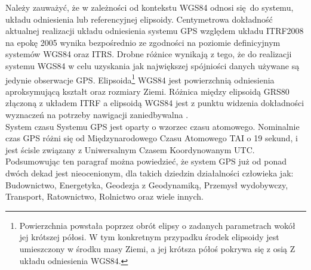 Należy zauważyć, że w zależności od kontekstu WGS84 odnosi się do systemu, układu odniesienia lub referencyjnej elipsoidy.
Centymetrowa dokładność aktualnej realizacji układu odniesienia systemu GPS względem układu ITRF2008 na epokę 2005
wynika bezpośrednio ze zgodności na poziomie definicyjnym systemów WGS84 oraz ITRS. Drobne różnice wynikają z tego, że do realizacji systemu WGS84 w celu uzyskania jak 
największej spójniości danych używane są jedynie obserwacje GPS. Elipsoida\footnote{Powierzchnia powstała poprzez obrót elipsy o zadanych parametrach wokół jej 
krótszej półosi. W tym konkretnym przypadku środek elipsoidy jest umieszczony w środku masy Ziemi, a jej krótsza półoś pokrywa się z osią Z układu odniesienia WGS84.}
WGS84 jest powierzchnią odniesienia aproksymującą kształt oraz rozmiary Ziemi. Różnica między elipsoidą GRS80 złączoną z układem ITRF a elipsoidą WGS84 jest z punktu 
widzenia dokładności wyznaczeń na potrzeby nawigacji zaniedbywalna \cite[][strona 50]{donnelly}.\\
\indent System czasu Systemu GPS jest oparty o wzorzec czasu atomowego. Nominalnie czas GPS różni się od Międzynarodowego Czasu Atomowego TAI o 19 sekund, i jest 
ścisle związany z Uniwersalnym Czasem Koordynowanym UTC.\\
Podsumowując ten paragraf można powiedzieć, że system GPS już od ponad dwóch dekad jest nieocenionym, dla takich dziedzin działalności człowieka jak:
Budownictwo, Energetyka, Geodezja z Geodynamiką, Przemysł wydobywczy, Transport, Ratownictwo, Rolnictwo oraz wiele innych.
